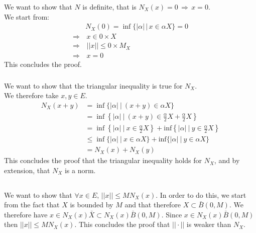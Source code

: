 \documentclass{article}
\begin{document}
\subsubsection{}%
We want to show that $N$ is definite, that is $N_X(x) = 0 \, \Rightarrow \, x=0$. \\

\noindent We start from:
\begin{align*}
	& N_X(0) = \inf\{|\alpha | \, |  \, x \in \alpha X\} = 0\\
	\Rightarrow& \, x \in 0 \times X\\
	\Rightarrow& \, ||x|| \leq 0 \times M_X\\
	\Rightarrow& \, x = 0
\end{align*}
This concludes the proof.


\subsubsection{}%

We want to show that the triangular inequality is true for $N_X$.\\ 
We therefore take $x,y \in E$.
\begin{align*}
N_X(x+y) &= \inf\{|\alpha| \ | \ (x+y) \in \alpha X\}\\
&= \inf\left\{|\alpha| \ | \ (x+y) \in \frac{\alpha}{2} X+ \frac{\alpha}{2} X\right\}\\
&= \inf\left\{|\alpha| \ | \ x \in \frac{\alpha}{2}  X\right\} +  \textrm{inf}\left\{|\alpha| \ | \ y\in \frac{\alpha}{2}  X\right\}\\
&\leq \inf\{|\alpha| \ | \ x\in \alpha X\} + \textrm{inf}\{|\alpha| \ | \ y\in \alpha X\}\\
&= N_X(x) + N_X(y)
\end{align*}
This concludes the proof that the triangular inequality holds for $N_X$, and by extension, that $N_X$ is a norm.

\subsection{} %

\subsubsection{} %

We want to show that $ \forall x \in E, \, ||x|| \leq MN_X(x)$. In order to do this, we start from the fact that $X$ is bounded by $M$ and that therefore $X \subset \bar{B}(0,M)$. We therefore have $x \in N_X(x)\bar{X} \subset N_X(x)\bar{B}(0,M)$. Since $x \in N_X(x)\bar{B}(0,M)$ then $||x|| \leq MN_X(x)$. This concludes the proof that $|| \cdot ||$ is weaker than $N_X$.
\end{document}
